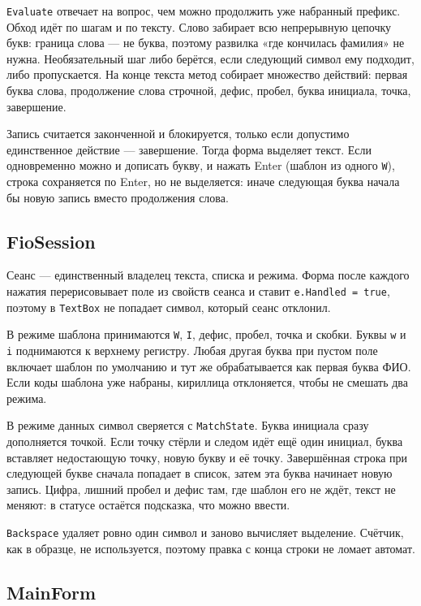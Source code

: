 \documentclass[a4paper,14pt]{extarticle}
\begin{document}
\texttt{Evaluate} отвечает на вопрос, чем можно продолжить уже набранный префикс. Обход идёт по шагам и по тексту. Слово забирает всю непрерывную цепочку букв: граница слова --- не буква, поэтому развилка «где кончилась фамилия» не нужна. Необязательный шаг либо берётся, если следующий символ ему подходит, либо пропускается. На конце текста метод собирает множество действий: первая буква слова, продолжение слова строчной, дефис, пробел, буква инициала, точка, завершение.

Запись считается законченной и блокируется, только если допустимо единственное действие --- завершение. Тогда форма выделяет текст. Если одновременно можно и дописать букву, и нажать Enter (шаблон из одного \texttt{W}), строка сохраняется по Enter, но не выделяется: иначе следующая буква начала бы новую запись вместо продолжения слова.

\subsection{FioSession}

Сеанс --- единственный владелец текста, списка и режима. Форма после каждого нажатия перерисовывает поле из свойств сеанса и ставит \texttt{e.Handled = true}, поэтому в \texttt{TextBox} не попадает символ, который сеанс отклонил.

В режиме шаблона принимаются \texttt{W}, \texttt{I}, дефис, пробел, точка и скобки. Буквы \texttt{w} и \texttt{i} поднимаются к верхнему регистру. Любая другая буква при пустом поле включает шаблон по умолчанию и тут же обрабатывается как первая буква ФИО. Если коды шаблона уже набраны, кириллица отклоняется, чтобы не смешать два режима.

В режиме данных символ сверяется с \texttt{MatchState}. Буква инициала сразу дополняется точкой. Если точку стёрли и следом идёт ещё один инициал, буква вставляет недостающую точку, новую букву и её точку. Завершённая строка при следующей букве сначала попадает в список, затем эта буква начинает новую запись. Цифра, лишний пробел и дефис там, где шаблон его не ждёт, текст не меняют: в статусе остаётся подсказка, что можно ввести.

\texttt{Backspace} удаляет ровно один символ и заново вычисляет выделение. Счётчик, как в образце, не используется, поэтому правка с конца строки не ломает автомат.

\subsection{MainForm}
\end{document}
